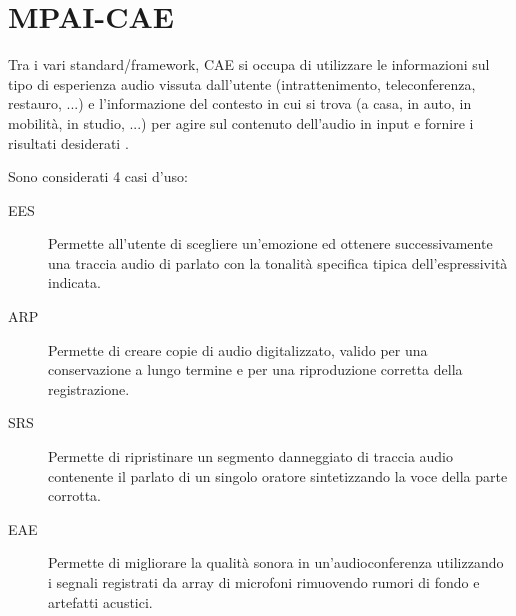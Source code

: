 \begin{adjustbox}{width=\textwidth}
\end{adjustbox} %


\section{MPAI-CAE} \label{sec:mpai-cae}
Tra i vari standard/framework, \ac{CAE} si occupa di utilizzare le informazioni sul tipo di esperienza audio vissuta dall'utente (intrattenimento, teleconferenza, restauro, ...) e l'informazione del contesto in cui si trova (a casa, in auto, in mobilità, in studio, ...) per agire sul contenuto dell'audio in input e fornire i risultati desiderati \cite{mpaiMPAICAE}.

Sono considerati 4 casi d'uso:
\begin{description}
    \item[\ac{EES}] Permette all'utente di scegliere un'emozione ed ottenere successivamente una traccia audio di parlato con la tonalità specifica tipica dell'espressività indicata.
    \item[\ac{ARP}] Permette di creare copie di audio digitalizzato, valido per una conservazione a lungo termine e per una riproduzione corretta della registrazione.
    \item[\ac{SRS}] Permette di ripristinare un segmento danneggiato di traccia audio contenente il parlato di un singolo oratore sintetizzando la voce della parte corrotta.
    \item[\ac{EAE}] Permette di migliorare la qualità sonora in un'audioconferenza utilizzando i segnali registrati da array di microfoni rimuovendo rumori di fondo e artefatti acustici.
\end{description}

